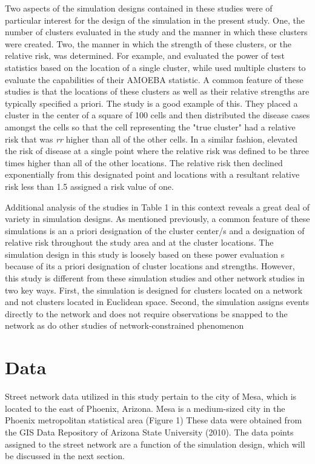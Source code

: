 \documentclass[12pt, letterpaper]{article}
\begin{document}
Two aspects of the simulation designs contained in these studies were of particular interest for the design of the simulation in the present study. One, the number of clusters evaluated in the study and the manner in which these clusters were created. Two, the manner in which the strength of these clusters, or the relative risk, was determined.  For example, \citet{tango1999comparison} and \citet{swartz1998entropy} evaluated the power of test statistics based on the location of a single cluster, while \citet{aldstadt2006using} used multiple clusters to evaluate the capabilities of their AMOEBA statistic. A common feature of these studies is that the locations of these clusters as well as their relative strengths are typically specified a priori. The \citet{kulldorff1995spatial} study is a good example of this. They placed a cluster in the center of a square of 100 cells and then distributed the disease cases amongst the cells so that the cell representing the "true cluster" had a relative risk that was \emph{rr} higher than all of the other cells. In a similar fashion, \cite{rogerson1999detection} elevated the risk of disease at a single point where the relative risk was defined to be three times higher than all of the other locations. The relative risk then declined exponentially from this designated point and locations with a resultant relative risk less than 1.5 assigned a risk value of one.   

Additional analysis of the studies in Table 1 in this context reveals a great deal of variety in simulation designs. As mentioned previously, a common feature of these simulations is an a priori designation of the cluster center/s and a designation of relative risk throughout the study area and at the cluster locations. The simulation design in this study is loosely based on these power evaluation s because of its a priori designation of cluster locations and strengths. However, this study is different from these simulation studies and other network studies in two key ways. First, the simulation is designed for clusters located on a network and not clusters located in Euclidean space. Second, the simulation assigns events directly to the network and does not require observations be snapped to the network as do other studies of network-constrained phenomenon \citep{borruso2008network, xie2008kernel, okabe2009kernel}


\section{Data} 
Street network data utilized in this study pertain to the city of Mesa, which is located to the east of Phoenix, Arizona. Mesa is a medium-sized city in the Phoenix metropolitan statistical area (Figure 1) %
These data were obtained from the GIS Data Repository of Arizona State University (2010). The data points assigned to the street network are a function of the simulation design, which will be discussed in the next section.
\end{document}

